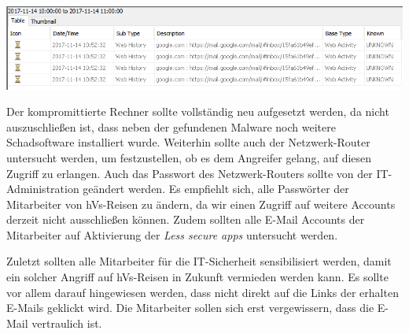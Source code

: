 \begin{center}
	\includegraphics[width=15.8cm]{figures/history2.PNG}
	\label{fig:history2}
\end{center}

Der kompromittierte Rechner sollte vollständig neu aufgesetzt werden, da nicht auszuschließen ist, dass neben der gefundenen Malware noch weitere Schadsoftware installiert wurde.
Weiterhin sollte auch der Netzwerk-Router untersucht werden, um festzustellen, ob es dem Angreifer gelang, auf diesen Zugriff zu erlangen.
Auch das Passwort des Netzwerk-Routers sollte von der IT-Administration geändert werden.
Es empfiehlt sich, alle Passwörter der Mitarbeiter von hVs-Reisen zu ändern, da wir einen Zugriff auf weitere Accounts derzeit nicht ausschließen können.
Zudem sollten alle E-Mail Accounts der Mitarbeiter auf Aktivierung der \textit{Less secure apps} untersucht werden.

Zuletzt sollten alle Mitarbeiter für die IT-Sicherheit sensibilisiert werden, damit ein solcher Angriff auf hVs-Reisen in Zukunft vermieden werden kann.
Es sollte vor allem darauf hingewiesen werden, dass nicht direkt auf die Links der erhalten E-Mails geklickt wird.
Die Mitarbeiter sollen sich erst vergewissern, dass die E-Mail vertraulich ist.